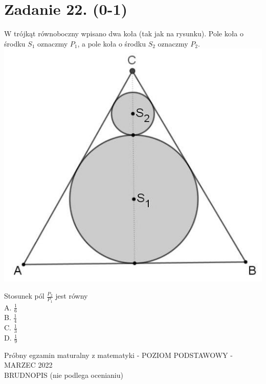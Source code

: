 \documentclass[10pt]{article}
\begin{document}
\section*{Zadanie 22. (0-1)}
W trójkąt równoboczny wpisano dwa koła (tak jak na rysunku). Pole koła o środku \(S_{1}\) oznaczmy \(P_{1}\), a pole koła o środku \(S_{2}\) oznaczmy \(P_{2}\).\\
\includegraphics[max width=\textwidth, center]{2024_11_21_fd555512e32c497e8a5dg-10}

Stosunek pól \(\frac{P_{2}}{P_{1}}\) jest równy\\
A. \(\frac{1}{6}\)\\
B. \(\frac{1}{4}\)\\
C. \(\frac{1}{3}\)\\
D. \(\frac{1}{9}\)

Próbny egzamin maturalny z matematyki - POZIOM PODSTAWOWY - MARZEC 2022\\
BRUDNOPIS (nie podlega ocenianiu)
\end{document}

